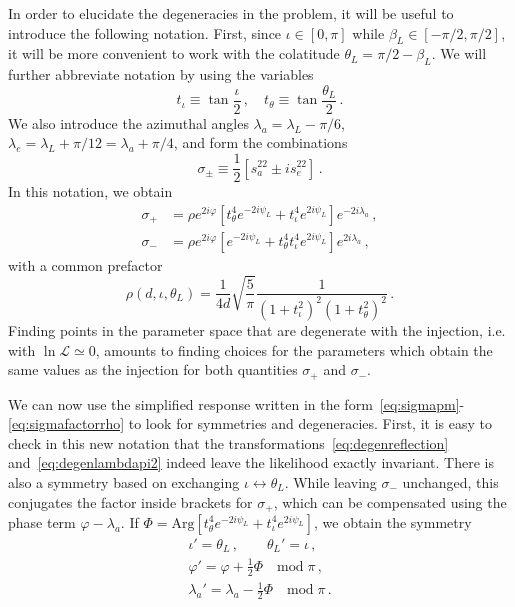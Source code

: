 \documentclass[aps,showpacs,twocolumn,prd,superscriptaddress,nofootinbib]{revtex4-1}
\newcommand{\be}{\begin{equation}}
\newcommand{\ee}{\end{equation}}
\newcommand{\bsub}{\begin{subequations}}
\newcommand{\esub}{\end{subequations}}
\newcommand\calL{{\mathcal{L}}}
\newcommand{\nn}{\nonumber}
\newcommand\psiL{{\psi_{L}}}
\begin{document}
In order to elucidate the degeneracies in the problem, it will be useful to introduce the following notation. First, since $\iota \in [0, \pi]$ while $\beta_{L} \in [-\pi/2, \pi/2]$, it will be more convenient to work with the colatitude $\theta_{L} = \pi/2 - \beta_{L}$. We will further abbreviate notation by using the variables
\be
	t_{\iota} \equiv \tan \frac{\iota}{2} \,, \quad t_{\theta} \equiv \tan \frac{\theta_{L}}{2} \,.
\ee
We also introduce the azimuthal angles $\lambda_{a} = \lambda_{L} - \pi/6$, $\lambda_{e} = \lambda_{L} + \pi/12 = \lambda_{a} + \pi/4$, and form the combinations
\be
	\sigma_{\pm} \equiv \frac{1}{2} \left[ s_{a}^{22} \pm i s_{e}^{22} \right] \,.
\ee
In this notation, we obtain
\bsub\label{eq:sigmapm}
\begin{align}
	\sigma_{+} &= \rho e^{2i\varphi} \left[ t_{\theta}^{4} e^{-2 i \psiL} + t_{\iota}^{4} e^{2 i \psiL} \right] e^{-2i \lambda_{a}} \,, \\
	\sigma_{-} &= \rho e^{2i\varphi} \left[ e^{-2 i \psiL} + t_{\theta}^{4} t_{\iota}^{4} e^{2 i \psiL} \right] e^{2i \lambda_{a}} \,,
\end{align}
\esub
with a common prefactor
\be\label{eq:sigmafactorrho}
	\rho(d, \iota, \theta_{L}) = \frac{1}{4d} \sqrt{\frac{5}{\pi}} \frac{1}{\left( 1 + t_{\iota}^{2} \right)^{2} \left(1 + t_{\theta}^{2} \right)^{2}} \,.
\ee
Finding points in the parameter space that are degenerate with the injection, {i.e.} with $\ln \calL \simeq 0$, amounts to finding choices for the parameters which obtain the same values as the injection for both quantities $\sigma_{+}$ and $\sigma_{-}$.

We can now use the simplified response written in the form~\eqref{eq:sigmapm}-\eqref{eq:sigmafactorrho} to look for symmetries and degeneracies. First, it is easy to check in this new notation that the transformations~\eqref{eq:degenreflection} and~\eqref{eq:degenlambdapi2} indeed leave the likelihood exactly invariant. There is also a symmetry based on exchanging $\iota \leftrightarrow \theta_{L}$. While leaving $\sigma_-$ unchanged, this conjugates the factor inside brackets for $\sigma_{+}$, which can be compensated using the phase term $\varphi - \lambda_{a}$. If $\Phi = \mathrm{Arg} \left[ t_{\theta}^{4} e^{-2 i \psiL} + t_{\iota}^{4} e^{2 i \psiL} \right] $, we obtain the symmetry
\begin{align}
	\iota' = \theta_{L} \,, \qquad \theta_{L}' = \iota \,, \nn\\
	\varphi' = \varphi + \frac{1}{2} \Phi \quad \mathrm{mod} \; \pi\,, \nn\\
	\lambda_{a}' = \lambda_{a} - \frac{1}{2} \Phi \quad \mathrm{mod} \; \pi\,.
\end{align}
\end{document}
